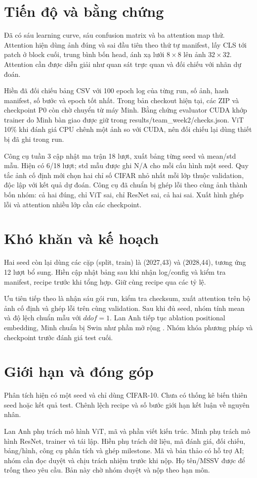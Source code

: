 \documentclass[11pt,a4paper]{article}
\begin{document}
\section{Tiến độ và bằng chứng}
Đã có sáu learning curve, sáu confusion matrix và ba attention map thử. Attention hiện dùng ảnh đúng và sai đầu tiên theo thứ tự manifest, lấy CLS tới patch ở block cuối, trung bình bốn head, ánh xạ lưới $8\times8$ lên ảnh $32\times32$. Attention cần được diễn giải như quan sát trực quan và đối chiếu với nhãn dự đoán.

Hiền đã đối chiếu bảng CSV với 100 epoch log của từng run, số ảnh, hash manifest, số bước và epoch tốt nhất. Trong bản checkout hiện tại, các ZIP và checkpoint P0 còn chờ chuyển từ máy Minh. Bằng chứng evaluator CUDA khớp trainer do Minh bàn giao được giữ trong results/team\_week2/checks.json. ViT 10\% khi đánh giá CPU chênh một ảnh so với CUDA, nên đối chiếu lại dùng thiết bị đã ghi trong run.

Công cụ tuần 3 cập nhật ma trận 18 lượt, xuất bảng từng seed và mean/std mẫu. Hiện có 6/18 lượt; std mẫu được ghi N/A cho mỗi cấu hình một seed. Quy tắc ảnh cố định mới chọn hai chỉ số CIFAR nhỏ nhất mỗi lớp thuộc validation, độc lập với kết quả dự đoán. Công cụ đã chuẩn bị ghép lỗi theo cùng ảnh thành bốn nhóm: cả hai đúng, chỉ ViT sai, chỉ ResNet sai, cả hai sai. Xuất hình ghép lỗi và attention nhiều lớp cần các checkpoint.

\section{Khó khăn và kế hoạch}
Hai seed còn lại dùng các cặp (split, train) là (2027,43) và (2028,44), tương ứng 12 lượt bổ sung. Hiền cập nhật bảng sau khi nhận log/config và kiểm tra manifest, recipe trước khi tổng hợp. Giữ cùng recipe qua các tỷ lệ.

Ưu tiên tiếp theo là nhận sáu gói run, kiểm tra checksum, xuất attention trên bộ ảnh cố định và ghép lỗi trên cùng validation. Sau khi đủ seed, nhóm tính mean và độ lệch chuẩn mẫu với $ddof=1$. Lan Anh tiếp tục ablation positional embedding, Minh chuẩn bị Swin như phần mở rộng \citep{liu2021swin}. Nhóm khóa phương pháp và checkpoint trước đánh giá test cuối.

\section*{Giới hạn và đóng góp}
Phân tích hiện có một seed và chỉ dùng CIFAR-10. Chưa có thống kê biến thiên seed hoặc kết quả test. Chênh lệch recipe và số bước giới hạn kết luận về nguyên nhân.

Lan Anh phụ trách mô hình ViT, mã và phần viết kiến trúc. Minh phụ trách mô hình ResNet, trainer và tái lập. Hiền phụ trách dữ liệu, mã đánh giá, đối chiếu, bảng/hình, công cụ phân tích và ghép milestone. Mã và bản thảo có hỗ trợ AI; nhóm cần đọc duyệt và chịu trách nhiệm trước khi nộp. Họ tên/MSSV được để trống theo yêu cầu. Bản này chờ nhóm duyệt và nộp theo hạn môn.

\end{document}
